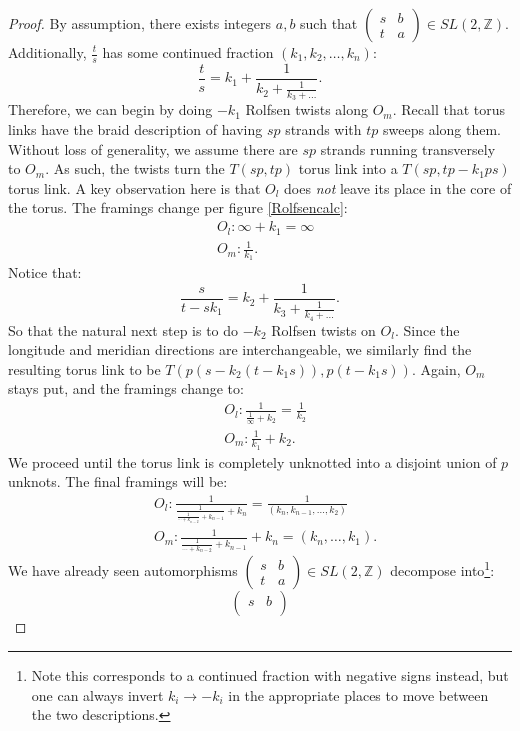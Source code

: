 \documentclass{article}
\numberwithin{corollary}{theorem}
\numberwithin{corollary}{proposition}
\begin{document}
\begin{proof}
By assumption, there exists integers $a,b$ such that $\begin{pmatrix}
    s&b\\
    t&a
\end{pmatrix}\in SL(2,\mathbb{Z})$. Additionally, $\frac{t}{s}$ has some continued fraction $(k_1,k_2,\ldots,k_n)$:
$$\frac{t}{s} = k_1+\frac{1}{k_2+\frac{1}{k_3+\ldots}}.$$
Therefore, we can begin by doing $-k_1$ Rolfsen twists along $O_m$. Recall that torus links have the braid description of having $s p$ strands with $tp$ sweeps along them. Without loss of generality, we assume there are $sp$ strands running transversely to $O_m$. As such, the twists turn the $T(sp,tp)$ torus link into a $T(sp,tp-k_1ps)$ torus link. A key observation here is that $O_l$ does \textit{not} leave its place in the core of the torus. The framings change per figure \ref{Rolfsencalc}:
\begin{align*}
&O_l: \infty +k_1 = \infty \\
&O_m: \frac{1}{k_1}.
\end{align*}
Notice that:
$$\frac{s}{t-sk_1} = k_2+\frac{1}{k_3+\frac{1}{k_4+\ldots}}.$$
So that the natural next step is to do $-k_2$ Rolfsen twists on $O_l$. Since the longitude and meridian directions are interchangeable, we similarly find the resulting torus link to be $T(p(s-k_2(t-k_1s)),p(t-k_1 s))$. Again, $O_m$ stays put, and the framings change to:
\begin{align*}&O_l: \frac{1}{\frac{1}{\infty}+k_2} = \frac{1}{k_2}\\
&O_m: \frac{1}{k_1}+k_2. \end{align*}
We proceed until the torus link is completely unknotted into a disjoint union of $p$ unknots. The final framings will be:
\begin{align*}&O_l: \frac{1}{\frac{1}{\frac{1}{\cdots+ k_{n-2}}+k_{n-1}}+k_n} = \frac{1}{(k_n,k_{n-1},\ldots,k_2)}\\
&O_m: \frac{1}{\frac{1}{\cdots+ k_{n-2}}+k_{n-1}}+k_n = (k_n,\ldots,k_1).\end{align*}
We have already seen automorphisms $\begin{pmatrix}
    s&b\\
    t&a
\end{pmatrix}\in SL(2,\mathbb{Z})$ decompose into\footnote{Note this corresponds to a continued fraction with negative signs instead, but one can always invert $k_i\rightarrow-k_i$ in the appropriate places to move between the two descriptions.}:
$$\begin{pmatrix}
    s&b\\

\end{pmatrix}$$
\end{proof}
\end{document}
